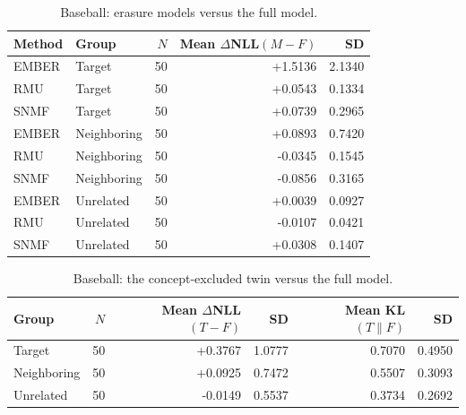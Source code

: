 \begin{table}[t]
\centering
\small
\begin{tabular}{llrrr}
\toprule
Method & Group & $N$ & Mean $\Delta$NLL$(M{-}F)$ & SD \\
\midrule
EMBER & Target & 50 & +1.5136 & 2.1340 \\
RMU & Target & 50 & +0.0543 & 0.1334 \\
SNMF & Target & 50 & +0.0739 & 0.2965 \\
EMBER & Neighboring & 50 & +0.0893 & 0.7420 \\
RMU & Neighboring & 50 & -0.0345 & 0.1545 \\
SNMF & Neighboring & 50 & -0.0856 & 0.3165 \\
EMBER & Unrelated & 50 & +0.0039 & 0.0927 \\
RMU & Unrelated & 50 & -0.0107 & 0.0421 \\
SNMF & Unrelated & 50 & +0.0308 & 0.1407 \\
\bottomrule
\end{tabular}
\caption{Baseball: erasure models versus the full model.}
\label{tab:baseball-vs-full}
\end{table}

\begin{table}[t]
\centering
\small
\begin{tabular}{lrrrrr}
\toprule
Group & $N$ & Mean $\Delta$NLL$(T{-}F)$ & SD & Mean KL$(T\|F)$ & SD \\
\midrule
Target & 50 & +0.3767 & 1.0777 & 0.7070 & 0.4950 \\
Neighboring & 50 & +0.0925 & 0.7472 & 0.5507 & 0.3093 \\
Unrelated & 50 & -0.0149 & 0.5537 & 0.3734 & 0.2692 \\
\bottomrule
\end{tabular}
\caption{Baseball: the concept-excluded twin versus the full model.}
\label{tab:baseball-twin-vs-full}
\end{table}

